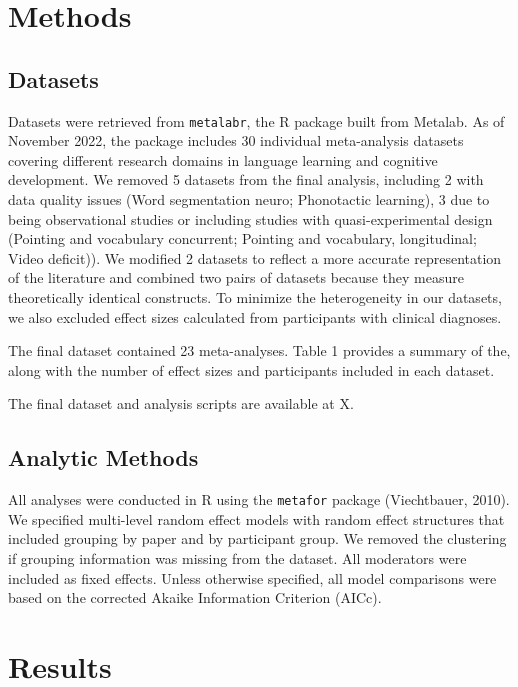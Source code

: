 \documentclass[10pt, letterpaper]{article}
\begin{document}
\hypertarget{methods}{%
\section{Methods}\label{methods}}

\hypertarget{datasets}{%
\subsection{Datasets}\label{datasets}}

Datasets were retrieved from \texttt{metalabr}, the R package built from
Metalab. As of November 2022, the package includes 30 individual
meta-analysis datasets covering different research domains in language
learning and cognitive development. We removed 5 datasets from the final
analysis, including 2 with data quality issues (Word segmentation neuro;
Phonotactic learning), 3 due to being observational studies or including
studies with quasi-experimental design (Pointing and vocabulary
concurrent; Pointing and vocabulary, longitudinal; Video deficit)). We
modified 2 datasets to reflect a more accurate representation of the
literature and combined two pairs of datasets because they measure
theoretically identical constructs. To minimize the heterogeneity in our
datasets, we also excluded effect sizes calculated from participants
with clinical diagnoses.

The final dataset contained 23 meta-analyses. Table 1 provides a summary
of the, along with the number of effect sizes and participants included
in each dataset.

The final dataset and analysis scripts are available at X.

\hypertarget{analytic-methods}{%
\subsection{Analytic Methods}\label{analytic-methods}}

All analyses were conducted in R using the \texttt{metafor} package
(Viechtbauer, 2010). We specified multi-level random effect models with
random effect structures that included grouping by paper and by
participant group. We removed the clustering if grouping information was
missing from the dataset. All moderators were included as fixed effects.
Unless otherwise specified, all model comparisons were based on the
corrected Akaike Information Criterion (AICc).

\hypertarget{results}{%
\section{Results}\label{results}}
\end{document}
